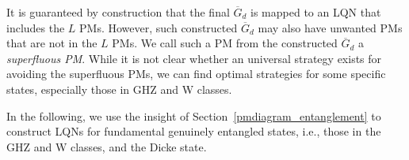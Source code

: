 \documentclass[a4paper,twocolumn,8pt,accepted=2021-12-15]{quantumarticle}
\newcommand{\blue}{\textcolor{blue}}
\def\dc{{\overline{G}_d }}
\begin{document}
	
	It is guaranteed by construction that the final $\dc$ is mapped to an LQN that includes the $L$ PMs. However, such constructed $\dc$ may also have unwanted PMs that are not in the $L$ PMs. We call such a PM from the constructed $\dc$ a \emph{superfluous PM}. While it is not clear whether an universal strategy exists for avoiding the superfluous PMs, we can find optimal strategies for some specific states, especially those in GHZ and W classes. 
	
	In the following, we use the insight of Section~\ref{pmdiagram_entanglement} to construct LQNs for fundamental genuinely entangled states, i.e., those in the GHZ and W classes, and the Dicke state.
	
	
\end{document}
